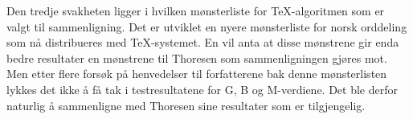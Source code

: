 Den tredje svakheten ligger i hvilken mønsterliste for \TeX{}-algoritmen som er valgt til sammenligning. Det er utviklet en nyere mønsterliste for norsk orddeling som nå distribueres med \TeX{}-systemet. En vil anta at disse mønstrene gir enda bedre resultater en mønstrene til Thoresen som sammenligningen gjøres mot. Men etter flere forsøk på henvedelser til forfatterene bak denne mønsterlisten lykkes det ikke å få tak i testresultatene for G, B og M-verdiene. Det ble derfor naturlig å sammenligne med Thoresen sine resultater som er tilgjengelig.
